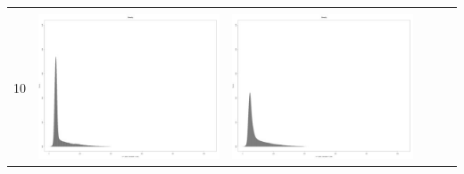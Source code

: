 \begin{table}[htbp]
{\begin{tabular}{l | ccccc}
\begin{minipage}{.085\textwidth}
    				 \end{minipage}\\			
		10	   & \begin{minipage}{.085\textwidth}\vspace{2pt}     							
     			 	\includegraphics[width=\linewidth]{images/mema-dens-graph/N2}
    				\end{minipage}
    			   & \begin{minipage}{.085\textwidth}\vspace{2pt}     							
     			 	\includegraphics[width=\linewidth]{images/mema-dens-graph/N6}
    				 \end{minipage}\\		

\end{tabular}}
\end{table}
